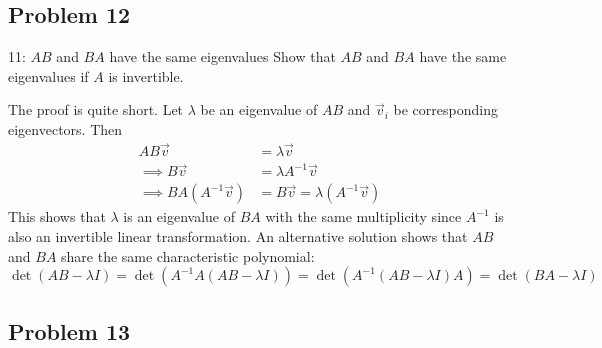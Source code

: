\documentclass[../main]{subfiles}
\begin{document}
\subsection{Problem 12}
\begin{bbox}{11: $AB$ and $BA$ have the same eigenvalues}
    Show that $AB$ and $BA$ have the same eigenvalues if $A$ is invertible.
\end{bbox}
\begin{solution}
    The proof is quite short. Let $\lambda$ be an eigenvalue of $AB$ and $\vec v_i$ be corresponding eigenvectors. Then 
    \begin{align*}
        AB \vec v &= \lambda \vec v\\
        \implies B\vec v &= \lambda A^{-1}\vec v\\
        \implies B A (A^{-1}\vec v) &= B\vec v = \lambda (A^{-1}\vec v)
    \end{align*}
    This shows that $\lambda$ is an eigenvalue of $BA$ with the same multiplicity since $A^{-1}$ is also an invertible linear transformation.
    \newline
    An alternative solution shows that $AB$ and $BA$ share the same characteristic polynomial:
    \[
    \det(AB - \lambda I) = \det(A^{-1}A(AB-\lambda I)) = \det(A^{-1}(AB-\lambda I)A) = \det(BA-\lambda I)
    \]
\end{solution}

\subsection{Problem 13}
\end{document}
